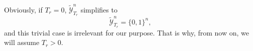 \documentclass{article}
\begin{document}
    Obviously, if $T_r = 0$, $\tilde{\mathcal{Y}}_{T_r}^n$ simplifies to 
    \begin{equation}
      \tilde{\mathcal{Y}}_{T_r}^n = \{0, 1\}^n,
    \end{equation}
    and this trivial case is irrelevant for our purpose. That is why, from now on, we will assume $T_r > 0$.
    
    
    
    
    
\end{document}
